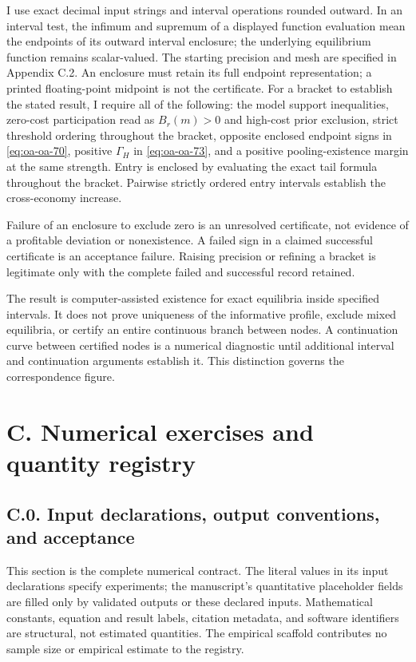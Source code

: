 \documentclass[
  11pt,
]{article}
\newcounter{none} %
\begin{document}
I use exact decimal input strings and interval operations rounded
outward. In an interval test, the infimum and supremum of a displayed
function evaluation mean the endpoints of its outward interval
enclosure; the underlying equilibrium function remains scalar-valued.
The starting precision and mesh are specified in Appendix C.2. An
enclosure must retain its full endpoint representation; a printed
floating-point midpoint is not the certificate. For a bracket to
establish the stated result, I require all of the following: the model
support inequalities, zero-cost participation read as \(B_r(m)>0\) and high-cost prior
exclusion, strict threshold ordering throughout the bracket, opposite
enclosed endpoint signs in \eqref{eq:oa-oa-70}, positive \(\Gamma_H\) in
\eqref{eq:oa-oa-73}, and a positive pooling-existence margin at the same
strength. Entry is enclosed by evaluating the exact tail formula
throughout the bracket. Pairwise strictly ordered entry intervals
establish the cross-economy increase.

Failure of an enclosure to exclude zero is an unresolved certificate,
not evidence of a profitable deviation or nonexistence. A failed sign in
a claimed successful certificate is an acceptance failure. Raising
precision or refining a bracket is legitimate only with the complete
failed and successful record retained.

The result is computer-assisted existence for exact equilibria inside
specified intervals. It does not prove uniqueness of the informative
profile, exclude mixed equilibria, or certify an entire continuous
branch between nodes. A continuation curve between certified nodes is a
numerical diagnostic until additional interval and continuation
arguments establish it. This distinction governs the correspondence
figure.

\section{C. Numerical exercises and quantity registry}\label{oa-c}

\subsection{C.0. Input declarations, output conventions, and
acceptance}\label{oa-c-contract}

This section is the complete numerical contract. The literal values in
its input declarations specify experiments; the manuscript's
quantitative placeholder fields are filled only by validated outputs or
these declared inputs. Mathematical constants, equation and result
labels, citation metadata, and software identifiers are structural, not
estimated quantities. The empirical scaffold contributes no sample size
or empirical estimate to the registry.
\end{document}
